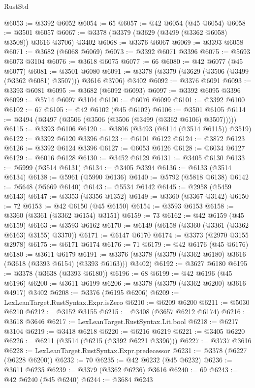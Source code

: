\begin{lexlean}{RustStd}
\begin{coremodule}
@6053 := @3392 @6052
@6054 := 65
@6057 := @42 @6054 (@45 @6054)
@6058 := @3501 @6057
@6067 := @3378 (@3379 (@3629 (@3499 (@3362 @6058) @3508)) @3616 @3706) @3402
@6068 := @3376 @6067
@6069 := @3393 @6058
@6071 := @3682 (@6068 @6069)
@6073 := @3392 @6071 @3396
@6075 := @5693 @6073 @3104
@6076 := @3618 @6075
@6077 := 66
@6080 := @42 @6077 (@45 @6077)
@6081 := @3501 @6080
@6091 := @3378 (@3379 (@3629 (@3506 (@3499 (@3362 @6081) @3507))) @3616 @3706) @3402
@6092 := @3376 @6091
@6093 := @3393 @6081
@6095 := @3682 (@6092 @6093)
@6097 := @3392 @6095 @3396
@6099 := @5714 @6097 @3104
@6100 := @6076 @6099
@6101 := @3392 @6100
@6102 := 67
@6105 := @42 @6102 (@45 @6102)
@6106 := @3501 @6105
@6114 := @3494 (@3497 (@3506 (@3506 (@3506 (@3499 (@3362 @6106) @3507)))))
@6115 := @3393 @6106
@6120 := @3806 (@3493 (@6114 (@3514 @6115)) @3519)
@6122 := @3392 @6120 @3396
@6123 := @6101 @6122
@6124 := @3872 @6123
@6126 := @3392 @6124 @3396
@6127 := @6053 @6126
@6128 := @6034 @6127
@6129 := @6016 @6128
@6130 := @3452 @6129
@6131 := @3405 @6130
@6133 := @5999 (@3514 @6131)
@6134 := @3405 @3394
@6136 := @6133 (@3514 @6134)
@6138 := @5961 (@5990 @6136)
@6140 := @5792 (@5818 @6138)
@6142 := @5648 (@5669 @6140)
@6143 := @5534 @6142
@6145 := @2958 (@5459 @6143)
@6147 := @3353 (@3356 @1352)
@6149 := @3360 (@3367 @3142)
@6150 := 72
@6153 := @42 @6150 (@45 @6150)
@6154 := @3593 @6153
@6158 := @3360 (@3361 (@3362 @6154) @3151)
@6159 := 73
@6162 := @42 @6159 (@45 @6159)
@6163 := @3593 @6162
@6170 := @6149 (@6158 (@3360 (@3361 (@3362 @6163) @3155) @3370))
@6171 := @6147 @6170
@6174 := @3373 (@2970 @3155 @2978)
@6175 := @6171 @6174
@6176 := 71
@6179 := @42 @6176 (@45 @6176)
@6180 := @3611 @6179
@6191 := @3376 (@3378 (@3379 (@3362 @6180) @3616 (@3618 (@3393 @6154) (@3393 @6163))) @3402)
@6192 := @3627 @6180
@6195 := @3378 (@3638 (@3393 @6180))
@6196 := 68
@6199 := @42 @6196 (@45 @6196)
@6200 := @3611 @6199
@6206 := @3378 (@3379 (@3362 @6200) @3616 @4917) @3402
@6208 := @3376 (@6195 @6206)
@6209 := LexLeanTarget.RustSyntax.Expr.isZero
@6210 := @6209 @6200
@6211 := @5030 @6210
@6212 := @3152 @3155
@6215 := @3408 (@3657 @6212 @6174)
@6216 := @3618 @3646
@6217 := LexLeanTarget.RustSyntax.Lit.bool
@6218 := @6217 @3104
@6219 := @3418 @6218
@6220 := @6216 @6219
@6221 := @3405 @6220
@6226 := @6211 (@3514 (@6215 (@3392 @6221 @3396)))
@6227 := @3737 @3616
@6228 := LexLeanTarget.RustSyntax.Expr.predecessor
@6231 := @3378 (@6227 (@6228 @6200))
@6232 := 70
@6235 := @42 @6232 (@45 @6232)
@6236 := @3611 @6235
@6239 := @3379 (@3362 @6236) @3616
@6240 := 69
@6243 := @42 @6240 (@45 @6240)
@6244 := @3684 @6243

\end{coremodule}
\end{lexlean}
